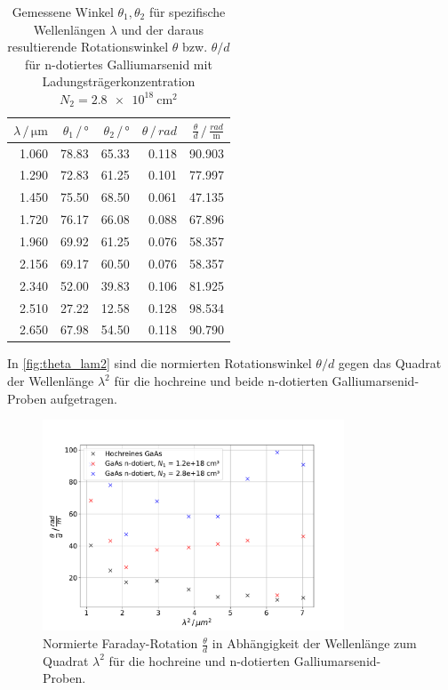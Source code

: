 \begin{table}
    \centering
    \caption{Gemessene Winkel $\theta_1, \theta_2$ für spezifische Wellenlängen $\lambda$ und der daraus resultierende Rotationswinkel $\theta$ bzw. $\theta/d$ für n-dotiertes Galliumarsenid mit Ladungsträgerkonzentration $N_2 = \qty{2.8e18}{\centi\metre^2}$}
    \label{tab:N2}
    \begin{tabular}{r r r r r}
        \toprule
        $\lambda \,/\, \unit{\micro\metre}$ & $\theta_1 \,/\, \unit{\degree}$ & $\theta_2 \,/\, \unit{\degree}$ & $\theta \,/\, \unit{rad}$ & $\frac{\theta}{d} \,/\, \frac{rad}{\unit{\metre}}$ \\
        \midrule
        1.060 & 78.83 & 65.33 & 0.118 & 90.903 \\
        1.290 & 72.83 & 61.25 & 0.101 & 77.997 \\
        1.450 & 75.50 & 68.50 & 0.061 & 47.135 \\
        1.720 & 76.17 & 66.08 & 0.088 & 67.896 \\
        1.960 & 69.92 & 61.25 & 0.076 & 58.357 \\
        2.156 & 69.17 & 60.50 & 0.076 & 58.357 \\
        2.340 & 52.00 & 39.83 & 0.106 & 81.925 \\
        2.510 & 27.22 & 12.58 & 0.128 & 98.534 \\
        2.650 & 67.98 & 54.50 & 0.118 & 90.790 \\      
        \bottomrule
    \end{tabular}
\end{table}
In \autoref{fig:theta_lam2} sind die normierten Rotationswinkel $\theta / d$ gegen das Quadrat der Wellenlänge $\lambda^2$ für die hochreine und beide n-dotierten Galliumarsenid-Proben aufgetragen.
\begin{figure}
    \centering
    \includegraphics[width=0.8\textwidth]{figure/theta_lam2.pdf}
    \caption{Normierte Faraday-Rotation $\frac{\theta}{d}$ in Abhängigkeit der Wellenlänge zum Quadrat $\lambda^2$ für die hochreine und n-dotierten Galliumarsenid-Proben.}
    \label{fig:theta_lam2}
\end{figure}
